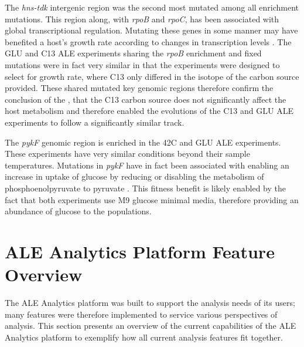 \documentclass[12pt,final,masters,chapterheads]{ucsd}  %
\begin{document}
The \textit{hns-tdk} intergenic region was the second most mutated among all enrichment mutations. This region along, with \textit{rpoB} and \textit{rpoC}, has been associated with global transcriptional regulation. Mutating these genes in some manner may have benefited a host's growth rate according to changes in transcription levels \cite{Kobayashi01011990, AYERS1989749, Cheng2014, Wang1445}. The GLU and C13 ALE experiments sharing the \textit{rpoB} enrichment and fixed mutations were in fact very similar in that the experiments were designed to select for growth rate, where C13 only differed in the isotope of the carbon source provided. These shared mutated key genomic regions therefore confirm the conclusion of the \cite{pmid26964043}, that the C13 carbon source does not significantly affect the host metabolism and therefore enabled the evolutions of the C13 and GLU ALE experiments to follow a significantly similar track.

The \textit{pykF} genomic region is enriched in the 42C and GLU ALE experiments. These experiments have very similar conditions beyond their sample temperatures. Mutations in \textit{pykF} have in fact been associated with enabling an increase in uptake of glucose by reducing or disabling the metabolism of phosphoenolpyruvate to pyruvate \cite{Woods13062006, 10.1371/journal.pgen.1001164, Blank25022014}. This fitness benefit is likely enabled by the fact that both experiments use M9 glucose minimal media, therefore providing an abundance of glucose to the populations.

\section{ALE Analytics Platform Feature Overview}
The ALE Analytics platform was built to support the analysis needs of its users; many features were therefore implemented to service various perspectives of analysis. This section presents an overview of the current capabilities of the ALE Analytics platform to exemplify how all current analysis features fit together.

% 
% 
\end{document}
